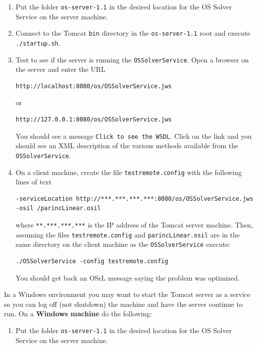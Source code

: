 \documentclass[11pt]{article}
\renewcommand{\_}{{\char"5F}}
\renewcommand{\{}{{\char"7B}}
\renewcommand{\}}{{\char"7D}}
\renewcommand{\^}{{\char"0D}}
\renewcommand{\'}{{\char"0D}}
\begin{document}
\begin{enumerate}[Step 1:]
\begin{enumerate}[Step 1.]
\item{}  Put the folder  {\tt os-server-1.1}   in the desired location for the OS Solver Service on the server machine.

\item{} Connect to the Tomcat {\tt bin} directory in the {\tt os-server-1.1} root and execute {\tt ./startup.sh}.

\item{} \label{itemize:tomcatunix3}
Test to see if the server is running the {\tt OSSolverService}.  Open a browser on the server and enter the URL
\begin{verbatim}
http://localhost:8080/os/OSSolverService.jws
\end{verbatim}
or
\begin{verbatim}
http://127.0.0.1:8080/os/OSSolverService.jws
\end{verbatim}
You should see a message {\tt Click to see the WSDL}.  Click on the link and you should see an XML description of 
the various methods available from the {\tt OSSolverService}.

\item{}  \label{itemize:tomcatunix4}
On a client machine, create  the file {\tt testremote.config} with the following lines of text
\begin{verbatim}
-serviceLocation http://***.***.***.***:8080/os/OSSolverService.jws
-osil /parincLinear.osil
\end{verbatim}
where {\tt ***.***.***.***} is the IP address of the Tomcat server machine. Then, assuming the files 
{\tt testremote.config} and {\tt parincLinear.osil} are in the same directory on the client machine as the 
{\tt OSSolverService} execute:
\begin{verbatim}
./OSSolverService -config testremote.config
\end{verbatim}
You should get back an OSrL message saying the problem was optimized.

\end{enumerate}

In a Windows environment you may want to start the Tomcat server as a service so you can log off (not shutdown) 
the machine and have the server continue to run. On a {\bf Windows machine} do the following:

\begin{enumerate}[Step 1.]

\item{}  Put the folder  {\tt os-server-1.1}   in the desired location for the OS Solver Service on the server machine.


\end{enumerate}
\end{enumerate}
\end{document}
